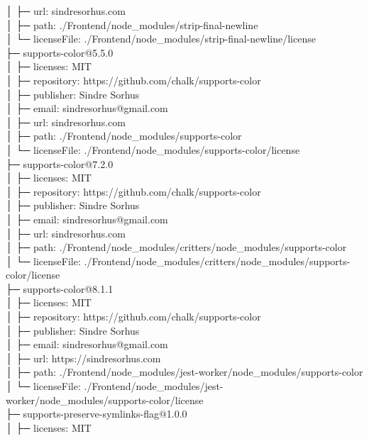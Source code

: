 \documentclass[
    paper=a4,
    twoside=false,
    parskip=half,
    listof=entryprefix,
    listof=totoc,
    index=totoc,
    bibliography=totoc,
    headsepline,
]{scrbook}
\begin{document}
    │  ├─ url: sindresorhus.com\\
    │  ├─ path: ./Frontend/node\_modules/strip-final-newline\\
    │  └─ licenseFile: ./Frontend/node\_modules/strip-final-newline/license\\
    ├─ supports-color@5.5.0\\
    │  ├─ licenses: MIT\\
    │  ├─ repository: https://github.com/chalk/supports-color\\
    │  ├─ publisher: Sindre Sorhus\\
    │  ├─ email: sindresorhus@gmail.com\\
    │  ├─ url: sindresorhus.com\\
    │  ├─ path: ./Frontend/node\_modules/supports-color\\
    │  └─ licenseFile: ./Frontend/node\_modules/supports-color/license\\
    ├─ supports-color@7.2.0\\
    │  ├─ licenses: MIT\\
    │  ├─ repository: https://github.com/chalk/supports-color\\
    │  ├─ publisher: Sindre Sorhus\\
    │  ├─ email: sindresorhus@gmail.com\\
    │  ├─ url: sindresorhus.com\\
    │  ├─ path: ./Frontend/node\_modules/critters/node\_modules/supports-color\\
    │  └─ licenseFile: ./Frontend/node\_modules/critters/node\_modules/supports-color/license\\
    ├─ supports-color@8.1.1\\
    │  ├─ licenses: MIT\\
    │  ├─ repository: https://github.com/chalk/supports-color\\
    │  ├─ publisher: Sindre Sorhus\\
    │  ├─ email: sindresorhus@gmail.com\\
    │  ├─ url: https://sindresorhus.com\\
    │  ├─ path: ./Frontend/node\_modules/jest-worker/node\_modules/supports-color\\
    │  └─ licenseFile: ./Frontend/node\_modules/jest-worker/node\_modules/supports-color/license\\
    ├─ supports-preserve-symlinks-flag@1.0.0\\
    │  ├─ licenses: MIT\\
\end{document}
